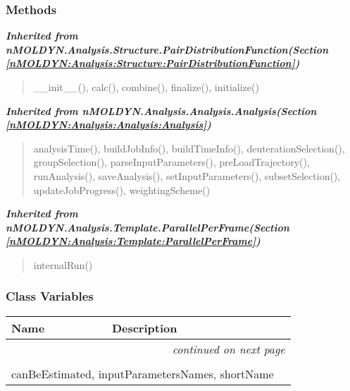 
  \subsubsection{Methods}


\large{\textbf{\textit{Inherited from nMOLDYN.Analysis.Structure.PairDistributionFunction\textit{(Section \ref{nMOLDYN:Analysis:Structure:PairDistributionFunction})}}}}

\begin{quote}
\_\_init\_\_(), calc(), combine(), finalize(), initialize()
\end{quote}

\large{\textbf{\textit{Inherited from nMOLDYN.Analysis.Analysis.Analysis\textit{(Section \ref{nMOLDYN:Analysis:Analysis:Analysis})}}}}

\begin{quote}
analysisTime(), buildJobInfo(), buildTimeInfo(), deuterationSelection(), groupSelection(), parseInputParameters(), preLoadTrajectory(), runAnalysis(), saveAnalysis(), setInputParameters(), subsetSelection(), updateJobProgress(), weightingScheme()
\end{quote}

\large{\textbf{\textit{Inherited from nMOLDYN.Analysis.Template.ParallelPerFrame\textit{(Section \ref{nMOLDYN:Analysis:Template:ParallelPerFrame})}}}}

\begin{quote}
internalRun()
\end{quote}


  \subsubsection{Class Variables}

    \vspace{-1cm}
\hspace{\varindent}\begin{longtable}{|p{\varnamewidth}|p{\vardescrwidth}|l}
\cline{1-2}
\cline{1-2} \centering \textbf{Name} & \centering \textbf{Description}& \\
\cline{1-2}
\endhead\cline{1-2}\multicolumn{3}{r}{\small\textit{continued on next page}}\\\endfoot\cline{1-2}
\endlastfoot\multicolumn{2}{|l|}{\textit{Inherited from nMOLDYN.Analysis.Structure.PairDistributionFunction \textit{(Section \ref{nMOLDYN:Analysis:Structure:PairDistributionFunction})}}}\\
\multicolumn{2}{|p{\varwidth}|}{\raggedright canBeEstimated, inputParametersNames, shortName}\\
\cline{1-2}
\end{longtable}

